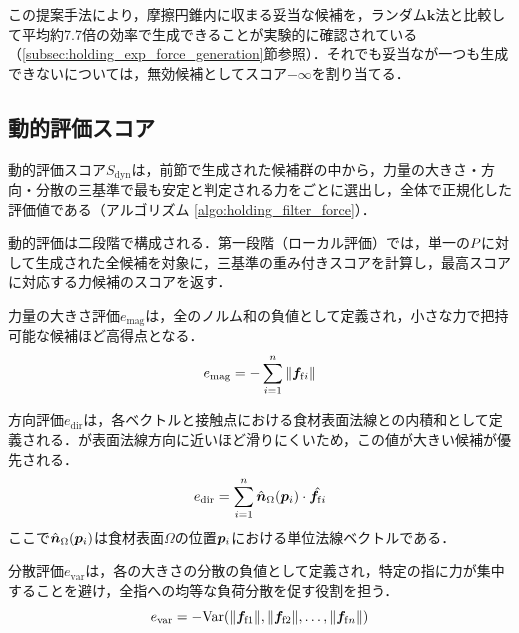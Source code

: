 この提案手法により，摩擦円錐内に収まる妥当な{\namegraspforce}候補を，ランダム$\bm{k}$法と比較して平均約7.7倍の効率で生成できることが実験的に確認されている（\ref{subsec:holding_exp_force_generation}節参照）．それでも妥当な{\namefingerforce}が一つも生成できない{\nameholdingpointset}については，無効候補としてスコア$-\infty$を割り当てる．


\subsection{動的評価スコア}
\label{subsec:holding_dynamic_score}

動的評価スコア$S_{\mathrm{dyn}}$は，前節で生成された{\namegraspforce}候補群の中から，力量の大きさ・方向・分散の三基準で最も安定と判定される力を{\nameholdingpointset}ごとに選出し，{\namesearchspace}全体で正規化した評価値である（アルゴリズム \ref{algo:holding_filter_force}）．

動的評価は二段階で構成される．第一段階（ローカル評価）では，単一の{\nameholdingpointset}$\equholdingpointset$に対して生成された全{\namegraspforce}候補を対象に，三基準の重み付きスコアを計算し，最高スコアに対応する力候補のスコアを返す．

力量の大きさ評価$e_{\mathrm{mag}}$は，全{\namefingerforce}のノルム和の負値として定義され，小さな力で把持可能な候補ほど高得点となる．
\begin{equation}
e_{\mathrm{mag}} = - \sum_{i=1}^n \|\equfingerforce[i]\|
\label{equ:holding_emag}
\end{equation}

方向評価$e_{\mathrm{dir}}$は，各{\namefingerforce}ベクトルと接触点における食材表面法線との内積和として定義される．{\namefingerforce}が表面法線方向に近いほど滑りにくいため，この値が大きい候補が優先される．
\begin{equation}
e_{\mathrm{dir}} = \sum_{i=1}^n \hat{\bm{n}}_{\Omega} (\equfingerpoint[][i]) \cdot \hat{\equfingerforce[i]}
\label{equ:holding_edir}
\end{equation}
ここで$\hat{\bm{n}}_{\Omega} (\equfingerpoint[][i])$は食材表面$\Omega$の位置$\equfingerpoint[][i]$における単位法線ベクトルである．

分散評価$e_{\mathrm{var}}$は，各{\namefingerforce}の大きさの分散の負値として定義され，特定の指に力が集中することを避け，全指への均等な負荷分散を促す役割を担う．
\begin{equation}
e_{\mathrm{var}} = - \mathrm{Var}(\|\equfingerforce[1]\|, \|\equfingerforce[2]\|, \dots, \|\equfingerforce[n]\|)
\label{equ:holding_evar}
\end{equation}

